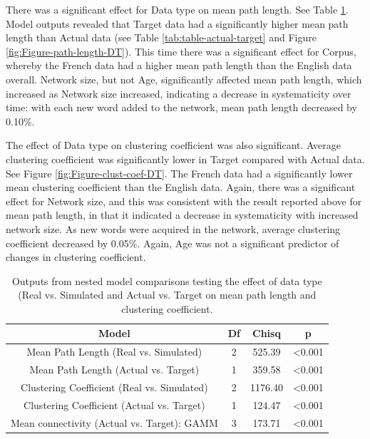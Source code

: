 \documentclass[
  man]{apa6}
\begin{document}
There was a significant effect for Data type on mean path length. See Table \ref{tab:table-model-output}. Model outputs revealed that Target data had a significantly higher mean path length than Actual data (see Table \ref{tab:table-actual-target} and Figure \ref{fig:Figure-path-length-DT}). This time there was a significant effect for Corpus, whereby the French data had a higher mean path length than the English data overall. Network size, but not Age, significantly affected mean path length, which increased as Network size increased, indicating a decrease in systematicity over time: with each new word added to the network, mean path length decreased by 0.10\%.

The effect of Data type on clustering coefficient was also significant. Average clustering coefficient was significantly lower in Target compared with Actual data. See Figure \ref{fig:Figure-clust-coef-DT}. The French data had a significantly lower mean clustering coefficient than the English data. Again, there was a significant effect for Network size, and this was consistent with the result reported above for mean path length, in that it indicated a decrease in systematicity with increased network size. As new words were acquired in the network, average clustering coefficient decreased by 0.05\%. Again, Age was not a significant predictor of changes in clustering coefficient.

\begin{longtable}[t]{cccc}
\caption{\label{tab:table-model-output}Outputs from nested model comparisons testing the effect of data type (Real vs. Simulated and Actual vs. Target on mean path length and clustering coefficient.}\\
\toprule
Model & Df & Chisq & p\\
\midrule
Mean Path Length (Real vs. Simulated) & 2 & 525.39 & <0.001\\
Mean Path Length (Actual vs. Target) & 1 & 359.58 & <0.001\\
Clustering Coefficient (Real vs. Simulated) & 2 & 1176.40 & <0.001\\
Clustering Coefficient (Actual vs. Target) & 1 & 124.47 & <0.001\\
Mean connectivity (Actual vs. Target): GAMM & 3 & 173.71 & <0.001\\
\bottomrule
\end{longtable}
\end{document}
